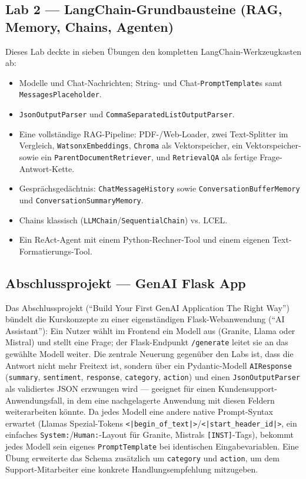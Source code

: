 \subsection{Lab 2 --- LangChain-Grundbausteine (RAG, Memory, Chains, Agenten)}

Dieses Lab deckte in sieben Übungen den kompletten LangChain-Werkzeugkasten ab:

\begin{itemize}
    \item Modelle und Chat-Nachrichten; String- und Chat-\texttt{PromptTemplate}s samt
          \texttt{MessagesPlaceholder}.
    \item \texttt{JsonOutputParser} und \texttt{CommaSeparatedListOutputParser}.
    \item Eine vollständige RAG-Pipeline: PDF-/Web-Loader, zwei Text-Splitter im
          Vergleich, \texttt{WatsonxEmbeddings}, \texttt{Chroma} als Vektorspeicher,
          ein Vektorspeicher- sowie ein \texttt{ParentDocumentRetriever}, und
          \texttt{RetrievalQA} als fertige Frage-Antwort-Kette.
    \item Gesprächsgedächtnis: \texttt{ChatMessageHistory} sowie
          \texttt{ConversationBufferMemory} und \texttt{ConversationSummaryMemory}.
    \item Chains klassisch (\texttt{LLMChain}/\texttt{SequentialChain}) vs. LCEL.
    \item Ein ReAct-Agent mit einem Python-Rechner-Tool und einem eigenen
          Text-Formatierungs-Tool.
\end{itemize}

\subsection{Abschlussprojekt --- GenAI Flask App}

Das Abschlussprojekt (\enquote{Build Your First GenAI Application The Right Way}) bündelt die
Kurskonzepte zu einer eigenständigen Flask-Webanwendung (\enquote{AI Assistant}): Ein Nutzer
wählt im Frontend ein Modell aus (Granite, Llama oder Mistral) und stellt eine Frage; der
Flask-Endpunkt \texttt{/generate} leitet sie an das gewählte Modell weiter. Die zentrale
Neuerung gegenüber den Labs ist, dass die Antwort nicht mehr Freitext ist, sondern über
ein Pydantic-Modell \texttt{AIResponse} (\texttt{summary}, \texttt{sentiment},
\texttt{response}, \texttt{category}, \texttt{action}) und einen
\texttt{JsonOutputParser} als validiertes JSON erzwungen wird --- geeignet für einen
Kundensupport-Anwendungsfall, in dem eine nachgelagerte Anwendung mit diesen Feldern
weiterarbeiten könnte. Da jedes Modell eine andere native Prompt-Syntax erwartet
(Llamas Spezial-Tokens \texttt{<|begin\_of\_text|>}/\texttt{<|start\_header\_id|>},
ein einfaches \texttt{System:}/\texttt{Human:}-Layout für Granite, Mistrals
\texttt{[INST]}-Tags), bekommt jedes Modell sein eigenes \texttt{PromptTemplate} bei
identischen Eingabevariablen. Eine Übung erweiterte das Schema zusätzlich um
\texttt{category} und \texttt{action}, um dem Support-Mitarbeiter eine konkrete
Handlungsempfehlung mitzugeben.

